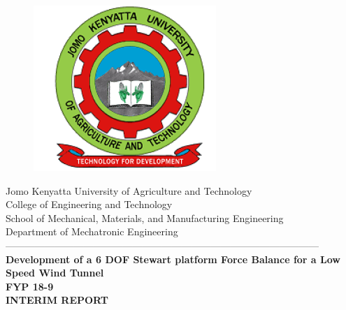 \documentclass[12pt,fleqn]{report}
\begin{document}
\begin{titlepage}
  \begin{center}
      \vspace*{-4.0cm}
    \begin{figure}[!h]
\centering
\includegraphics[width=0.3\linewidth]{Figures/JKUAT_logo}
\label{fig:jomologo}
\end{figure}
   \large{Jomo Kenyatta University of Agriculture and Technology}\\
    \large{College of Engineering and Technology}\\
    \large{School of Mechanical, Materials, and Manufacturing Engineering}\\
   \large{Department of Mechatronic Engineering}\\

    ------------------------------------------------------------------------------------------------\\[1.0cm]
    \vspace{0.1cm}
    \LARGE{\textbf{Development of a 6 DOF Stewart platform
        Force Balance for a Low Speed Wind Tunnel}}\\
    \vspace{0.3cm}
    \LARGE{\textbf{FYP 18-9
            }}\\
    {\textbf{INTERIM REPORT
                }}\\[0.4cm]


\end{center}
\end{titlepage}
\end{document}
